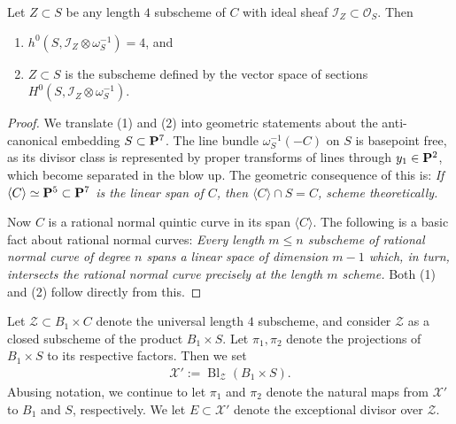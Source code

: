 \documentclass[12pt,reqno]{amsart}
\DeclareMathOperator{\Bl}{Bl}
\numberwithin{equation}{section}
\newcommand{\cX}{\mathcal{X}}
\begin{document}
\begin{proposition}
  \label{prop:B1} Let $Z \subset S$ be any length $4$ subscheme of $C$
  with ideal sheaf $\mathcal{I}_{Z} \subset \mathcal{O}_{S}$. Then
  \begin{enumerate}
  \item $h^{0}(S, \mathcal{I}_{Z} \otimes \omega_{S}^{-1}) = 4$, and
  \item $Z \subset S$ is the subscheme defined by the vector space of
    sections $H^{0}(S, \mathcal{I}_{Z} \otimes \omega_{S}^{-1})$.
  \end{enumerate}
\end{proposition}

\begin{proof}
  We translate (1) and (2) into geometric statements about the
  anti-canonical embedding $S \subset \P^{7}$.  The line bundle
  $\omega_{S}^{-1}(-C)$ on $S$ is basepoint free, as its divisor class
  is represented by proper transforms of lines through
  $y_{1} \in \P^2$, which become separated in the blow up.  The
  geometric consequence of this is: {\sl If
    $\langle C \rangle \simeq \P^5 \subset \P^7$ is the linear span of
    $C$, then $\langle C \rangle \cap S = C$, scheme theoretically.}

  Now $C$ is a rational normal quintic curve in its span
  $\langle C \rangle$. The following is a basic fact about rational
  normal curves: {\sl Every length $m \leq n$ subscheme of rational
    normal curve of degree $n$ spans a linear space of dimension $m-1$
    which, in turn, intersects the rational normal curve precisely at
    the length $m$ scheme.}  Both (1) and (2) follow directly from
  this.
\end{proof}

Let $\mathcal{Z} \subset B_1 \times C$ denote the universal
length $4$ subscheme, and consider $\mathcal{Z}$ as a closed subscheme
of the product $B_1 \times S$. Let $\pi_{1}, \pi_{2}$ denote the
projections of $B_1 \times S$ to its respective factors.
Then we set
\begin{align}
  \label{eq:X1}
  \cX' := \Bl_{\mathcal{Z}} \left( B_1 \times S \right).
\end{align}
Abusing notation, we continue to let $\pi_{1}$ and $\pi_{2}$ denote
the natural maps from $\cX'$ to $B_1$ and $S$, respectively.  We
let $E \subset \cX'$ denote the exceptional divisor over $\mathcal{Z}$.
\end{document}

